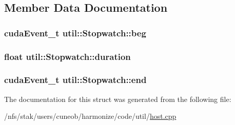 \subsection{Member Data Documentation}
\hypertarget{structutil_1_1Stopwatch_a604bcbe1e48afa332e945fc0437b9d87}{
\subsubsection[{beg}]{\setlength{\rightskip}{0pt plus 5cm}cuda\-Event\-\_\-t util\-::\-Stopwatch\-::beg}}\label{structutil_1_1Stopwatch_a604bcbe1e48afa332e945fc0437b9d87}
\hypertarget{structutil_1_1Stopwatch_acab3de1d02591cf569697ebba9df2da0}{
\subsubsection[{duration}]{\setlength{\rightskip}{0pt plus 5cm}float util\-::\-Stopwatch\-::duration}}\label{structutil_1_1Stopwatch_acab3de1d02591cf569697ebba9df2da0}
\hypertarget{structutil_1_1Stopwatch_aba2fd438fd766a8d26014d1d2c53687a}{
\subsubsection[{end}]{\setlength{\rightskip}{0pt plus 5cm}cuda\-Event\-\_\-t util\-::\-Stopwatch\-::end}}\label{structutil_1_1Stopwatch_aba2fd438fd766a8d26014d1d2c53687a}


The documentation for this struct was generated from the following file\-:\begin{DoxyCompactItemize}
\item 
/nfs/stak/users/cuneob/harmonize/code/util/\hyperlink{host_8cpp}{host.\-cpp}\end{DoxyCompactItemize}
